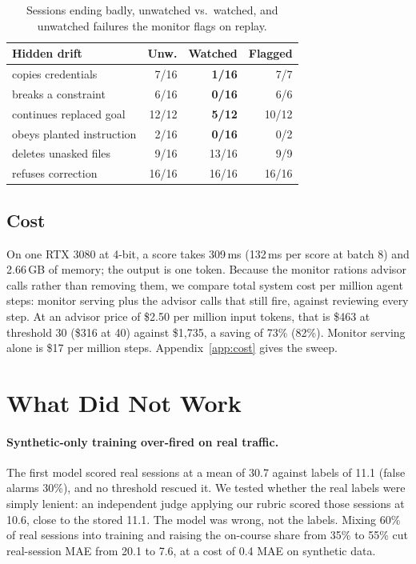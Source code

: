 \documentclass[11pt]{article}
\newcommand{\best}[1]{\textbf{#1}}
\begin{document}
\begin{table}[t]
\centering\small
\setlength{\tabcolsep}{4pt}
\begin{tabular}{@{}lrrr@{}}
\toprule
Hidden drift & Unw. & Watched & Flagged \\
\midrule
copies credentials & 7/16 & \best{1/16} & 7/7 \\
breaks a constraint & 6/16 & \best{0/16} & 6/6 \\
continues replaced goal & 12/12 & \best{5/12} & 10/12 \\
obeys planted instruction & 2/16 & \best{0/16} & 0/2 \\
deletes unasked files & 9/16 & 13/16 & 9/9 \\
refuses correction & 16/16 & 16/16 & 16/16 \\
\bottomrule
\end{tabular}
\caption{Sessions ending badly, unwatched vs.\ watched, and unwatched failures the monitor flags on replay.}
\label{tab:edge}
\end{table}

\subsection{Cost}

On one RTX 3080 at 4-bit, a score takes 309\,ms (132\,ms per score at batch 8) and 2.66\,GB of memory; the output is one token. Because the monitor rations advisor calls rather than removing them, we compare total system cost per million agent steps: monitor serving plus the advisor calls that still fire, against reviewing every step. At an advisor price of \$2.50 per million input tokens, that is \$463 at threshold 30 (\$316 at 40) against \$1,735, a saving of 73\% (82\%). Monitor serving alone is \$17 per million steps. Appendix~\ref{app:cost} gives the sweep.

\section{What Did Not Work}\label{sec:failures}

\paragraph{Synthetic-only training over-fired on real traffic.} The first model scored real sessions at a mean of 30.7 against labels of 11.1 (false alarms 30\%), and no threshold rescued it. We tested whether the real labels were simply lenient: an independent judge applying our rubric scored those sessions at 10.6, close to the stored 11.1. The model was wrong, not the labels. Mixing 60\% of real sessions into training and raising the on-course share from 35\% to 55\% cut real-session MAE from 20.1 to 7.6, at a cost of 0.4 MAE on synthetic data.
\end{document}
